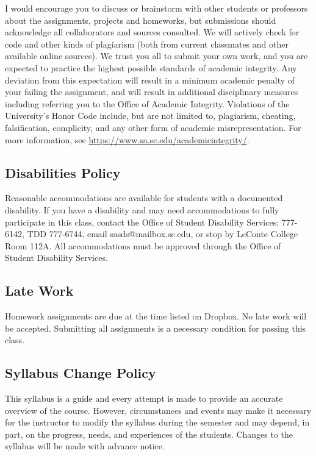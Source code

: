 \documentclass[11pt]{article}
\begin{document}
I would encourage you to discuss or brainstorm with other students or professors about the assignments, projects and homeworks, but submissions should acknowledge all collaborators and sources consulted. We will actively check for code and other kinds of plagiarism (both from current classmates and other available online sources). We trust you all to submit your own work, and you are expected to practice the highest possible standards of academic integrity. Any deviation from this expectation will result in a minimum academic penalty of your failing the assignment, and will result in additional disciplinary measures including referring you to the Office of Academic Integrity. Violations of the University's Honor Code include, but are not limited to, plagiarism, cheating, falsification, complicity, and any other form of academic misrepresentation. For more information, see \url{https://www.sa.sc.edu/academicintegrity/}.

\subsection*{Disabilities Policy}

Reasonable accommodations are available for students with a documented disability. If you have a disability and may need accommodations to fully participate in this class, contact the Office of Student Disability Services: 777-6142, TDD 777-6744, email sasds@mailbox.sc.edu, or stop by LeConte College Room 112A. All accommodations must be approved through the Office of Student Disability Services.

\subsection*{Late Work}

Homework assignments are due at the time listed on Dropbox.  No late work will be accepted. Submitting all assignments is a necessary condition for passing this class.

\subsection*{Syllabus Change Policy}

This syllabus is a guide and every attempt is made to provide an accurate overview of the course. However, circumstances and events may make it necessary for the instructor to modify the syllabus during the semester and may depend, in part, on the progress, needs, and experiences of the students. Changes to the syllabus will be made with advance notice.
\end{document}
